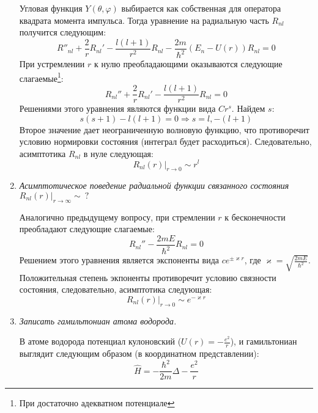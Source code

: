 \documentclass{article}
\begin{document}
\begin{enumerate}
		 Угловая функция $Y(\theta, \varphi)$ выбирается как собственная для оператора квадрата момента импульса. Тогда уравнение на радиальную часть $R_{nl}$ получится следующим:
		 \begin{equation}
		 	R''_{nl} + \frac{2}{r}R_{nl}' - \frac{l(l+1)}{r^2}R_{nl} - \frac{2m}{\hbar^2}(E_n-U(r))R_{nl} = 0
		 \end{equation}
		 При устремлении $r$ к нулю преобладающими оказываются следующие слагаемые\footnote{При достаточно адекватном потенциале}:
		 \begin{equation}
		 	R_{nl}'' +\frac{2}{r} R_{nl}' - \frac{l(l+1)}{r^2}R_{nl} = 0
		 \end{equation}
		 Решениями этого уравнения являются функции вида $Cr^s$. Найдем $s$:
		 \begin{equation}
		 	s(s+1) - l(l+1) = 0 \Rightarrow s = l, -(l+1)
		 \end{equation}
		 Второе значение дает неограниченную волновую функцию, что противоречит условию нормировки состояния (интеграл будет расходиться). Следовательно, асимптотика $R_{nl}$ в нуле следующая:
		 \begin{equation}
		 	\left.R_{nl}(r)\right|_{r \to 0} \sim r^l
		 \end{equation}
		 
		 \item \textit{Асимптотическое поведение радиальной функции связанного состояния $\left.R_{nl}(r)\right|_{r \to \infty} \sim \ ?$}
		 
		 Аналогично предыдущему вопросу, при стремлении $r$ к бесконечности преобладают следующие слагаемые:
		 \begin{equation}
		 	R_{nl}'' - \frac{2mE}{\hbar^2}R_{nl} = 0
		 \end{equation}
		 Решением этого уравнения является экспоненты вида $c e^{\pm \varkappa r}$, где $\varkappa = \sqrt{\frac{2mE}{\hbar^2}}$. Положительная степень экпоненты противоречит условию связности состояния, следовательно, асимптотика следующая:
		 \begin{equation}
		 	\left.R_{nl}(r)\right|_{r \to 0} \sim e^{- \varkappa r}
		 \end{equation}
		 
		 \item \textit{Записать гамильтониан атома водорода.}
		 
		 В атоме водорода потенциал кулоновский ($U(r) = -\frac{e^2}{r}$), и гамильтониан выглядит следующим образом (в координатном представлении):
		 \begin{equation}
		 	\hat{H} = -\frac{\hbar^2}{2m}\Delta -\frac{e^2}{r}
		 \end{equation}
		 

\end{enumerate}
\end{document}
